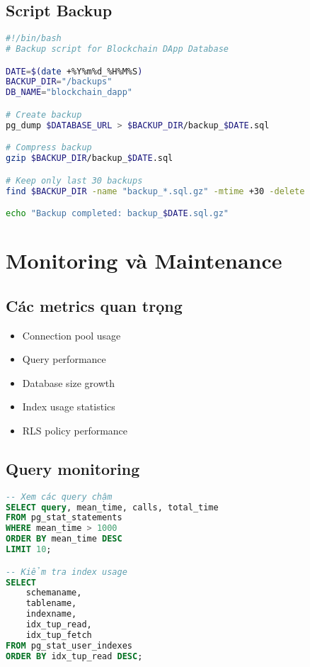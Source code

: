 \documentclass[12pt,a4paper]{article}
\begin{document}
\subsection{Script Backup}
\begin{lstlisting}[language=bash, caption=Script backup database]
#!/bin/bash
# Backup script for Blockchain DApp Database

DATE=$(date +%Y%m%d_%H%M%S)
BACKUP_DIR="/backups"
DB_NAME="blockchain_dapp"

# Create backup
pg_dump $DATABASE_URL > $BACKUP_DIR/backup_$DATE.sql

# Compress backup
gzip $BACKUP_DIR/backup_$DATE.sql

# Keep only last 30 backups
find $BACKUP_DIR -name "backup_*.sql.gz" -mtime +30 -delete

echo "Backup completed: backup_$DATE.sql.gz"
\end{lstlisting}

\section{Monitoring và Maintenance}

\subsection{Các metrics quan trọng}
\begin{itemize}
    \item Connection pool usage
    \item Query performance
    \item Database size growth
    \item Index usage statistics
    \item RLS policy performance
\end{itemize}

\subsection{Query monitoring}
\begin{lstlisting}[language=SQL, caption=Monitoring slow queries]
-- Xem các query chậm
SELECT query, mean_time, calls, total_time
FROM pg_stat_statements
WHERE mean_time > 1000
ORDER BY mean_time DESC
LIMIT 10;

-- Kiểm tra index usage
SELECT 
    schemaname,
    tablename,
    indexname,
    idx_tup_read,
    idx_tup_fetch
FROM pg_stat_user_indexes
ORDER BY idx_tup_read DESC;
\end{lstlisting}
\end{document}
